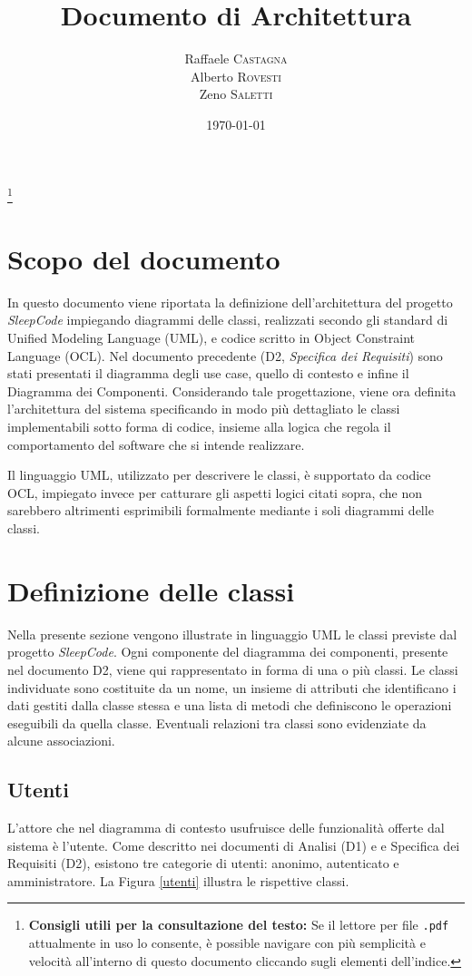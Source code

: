 \documentclass[11pt, a4paper]{article}
\title{Documento di Architettura}
\author{Raffaele \textsc{Castagna}\\
Alberto \textsc{Rovesti}\\
Zeno \textsc{Saletti}}
\date{\today}
\theoremstyle{definition} %
\newcommand\blfootnote[1]{%
  \begingroup
  \renewcommand\thefootnote{}\footnote{#1}%
  \addtocounter{footnote}{-1}%
  \endgroup
}
\begin{document}


\tableofcontents\blfootnote{\textbf{Consigli utili per la consultazione del testo:} Se il lettore per file \texttt{.pdf} attualmente in uso lo consente, è possible navigare con più semplicità e velocità all'interno di questo documento cliccando sugli elementi dell'indice.}

\newpage

\section*{Scopo del documento}
In questo documento viene riportata la definizione dell'architettura del
progetto \textit{SleepCode} impiegando diagrammi delle classi, realizzati
secondo gli standard di Unified Modeling Language (UML), e codice scritto in Object
Constraint Language (OCL). Nel documento precedente (D2, \textit{Specifica
dei Requisiti}) sono stati presentati il diagramma degli use case, quello
di contesto e infine il Diagramma dei Componenti. Considerando tale
progettazione, viene ora definita l'architettura del sistema specificando
in modo più dettagliato le classi implementabili sotto forma di
codice, insieme alla logica che regola il comportamento del software che
si intende realizzare.

Il linguaggio UML, utilizzato per descrivere le classi, è supportato da
codice OCL, impiegato invece per catturare gli aspetti logici citati sopra,
che non sarebbero altrimenti esprimibili formalmente mediante i soli diagrammi delle
classi.


\newpage
\section{Definizione delle classi}
Nella presente sezione vengono illustrate in linguaggio UML le classi
previste dal progetto \textit{SleepCode}. Ogni componente del diagramma
dei componenti, presente nel documento D2, viene qui rappresentato
in forma di una o più classi. Le classi individuate sono costituite
da un nome, un insieme di attributi che identificano i dati gestiti dalla
classe stessa e una lista di metodi che definiscono le operazioni
eseguibili da quella classe. Eventuali relazioni tra classi sono evidenziate
da alcune associazioni.

\subsection{Utenti}
L'attore che nel diagramma di contesto usufruisce delle funzionalità offerte
dal sistema è l'utente. Come descritto nei documenti di Analisi (D1) e
e Specifica dei Requisiti (D2), esistono tre categorie di utenti: anonimo, autenticato
e amministratore. La Figura \ref{utenti} illustra le rispettive classi.
\end{document}
